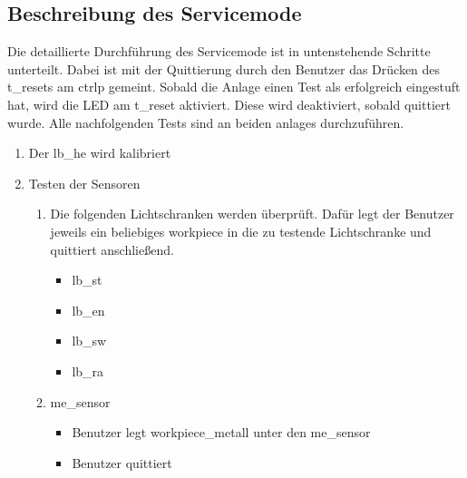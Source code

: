 \subsection{Beschreibung des Servicemode}\label{subsec:beschreibung-des-servicemode}
Die detaillierte Durchführung des Servicemode ist in untenstehende Schritte unterteilt.
Dabei ist mit der Quittierung durch den Benutzer das Drücken des \gls{t_reset}s am \gls{ctrlp} gemeint.
Sobald die Anlage einen Test als erfolgreich eingestuft hat, wird die LED am \gls{t_reset} aktiviert.
Diese wird deaktiviert, sobald quittiert wurde.
Alle nachfolgenden Tests sind an beiden \glspl{anlage} durchzuführen.
\begin{enumerate}
    \item Der \gls{lb_he} wird kalibriert
    \item Testen der Sensoren
    \begin{enumerate}
        \item Die folgenden Lichtschranken werden überprüft.
        Dafür legt der Benutzer jeweils ein beliebiges \gls{workpiece} in die zu testende Lichtschranke und
        quittiert anschließend.
        \begin{itemize}
            \item \gls{lb_st}
            \item \gls{lb_en}
            \item \gls{lb_sw}
            \item \gls{lb_ra}
        \end{itemize}

        \item \Gls{me_sensor}
        \begin{itemize}
            \item Benutzer legt \gls{workpiece_metall} unter den \gls{me_sensor}
            \item Benutzer quittiert
        \end{itemize}
    \end{enumerate}


\end{enumerate}
